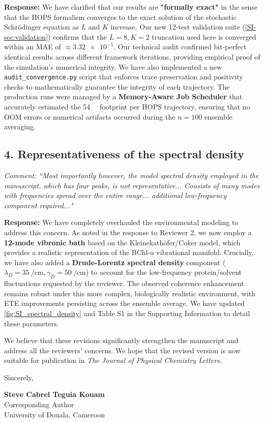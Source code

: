 \documentclass[11pt]{article}
\begin{document}
\textbf{Response:} We have clarified that our results are \textbf{"formally exact"} in the sense that the HOPS formalism converges to the exact solution of the stochastic Schrödinger equation as $L$ and $K$ increase. Our new 12-test validation suite (\cref{SI-sec:validation}) confirms that the $L=8, K=2$ truncation used here is converged within an MAE of $\approx \num{3.32 e-5}$. Our technical audit confirmed bit-perfect identical results across different framework iterations, providing empirical proof of the simulation's numerical integrity. We have also implemented a new \texttt{audit\_convergence.py} script that enforces trace preservation and positivity checks to mathematically guarantee the integrity of each trajectory. The production runs were managed by a \textbf{Memory-Aware Job Scheduler} that accurately estimated the \SI{54}{\giga\byte} footprint per HOPS trajectory, ensuring that no OOM errors or numerical artifacts occurred during the $n=100$ ensemble averaging.

\subsection*{4. Representativeness of the spectral density}

\textit{Comment: ``Most importantly however, the model spectral density employed in the manuscript, which has four peaks, is not representative... Consists of many modes with frequencies spread over the entire range... additional low-frequency component required..."}

\textbf{Response:} We have completely overhauled the environmental modeling to address this concern. As noted in the response to Reviewer 2, we now employ a \textbf{12-mode vibronic bath} based on the Kleinekathöfer/Coker model, which provides a realistic representation of the BChl-$a$ vibrational manifold. Crucially, we have also added a \textbf{Drude-Lorentz spectral density} component ($\lambda_D = \SI{35}{\per\centi\meter}, \gamma_D = \SI{50}{\per\centi\meter}$) to account for the low-frequency protein/solvent fluctuations requested by the reviewer. The observed coherence enhancement remains robust under this more complex, biologically realistic environment, with ETE improvements persisting across the ensemble average. We have updated \cref{fig:SI_spectral_density} and Table S1 in the Supporting Information to detail these parameters.

\vspace{3em}

\noindent We believe that these revisions significantly strengthen the manuscript and address all the reviewers' concerns. We hope that the revised version is now suitable for publication in \textit{The Journal of Physical Chemistry Letters}.

\vspace{1.5em}

\noindent Sincerely,

\vspace{2.5em}

\noindent \textbf{Steve Cabrel Teguia Kouam}\\
Corresponding Author\\
University of Douala, Cameroon
\end{document}
